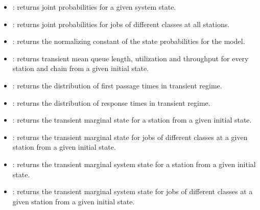 \begin{itemize}
\item {}: returns joint probabilities for a given system state.
\item {}: returns joint probabilities for jobs of different classes at all stations.
\item {}: returns the normalizing constant of the state probabilities for the model.
\item {}: returns transient mean queue length, utilization and throughput for every station and chain from a given initial state.
\item {}: returns the distribution of first passage times in transient regime.
\item {}: returns the distribution of response times in transient regime.
\item {}: returns the transient marginal state for a station from a given initial state.
\item {}: returns the transient marginal state for jobs of different classes at a given station from a given initial state.
\item {}: returns the transient marginal system state for a station from a given initial state.
\item {}: returns the transient marginal system state for jobs of different classes at a given station from a given initial state.
\end{itemize}


